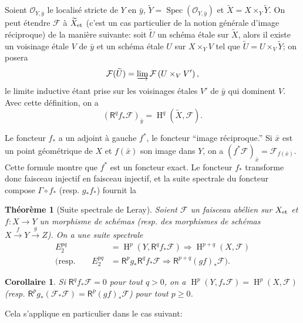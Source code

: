 \documentclass{book}
\DeclareMathOperator{\h}{H}
\DeclareMathOperator{\spec}{Spec}
\newcommand{\cF}{\mathcal{F}}
\newcommand{\cO}{\mathcal{O}}
\newcommand{\et}[1]{{#1}_{\textnormal{et}}}
\newcommand{\R}{\mathsf{R}}
\newtheorem{corollary}[subsubsection]{Corollaire}
\newtheorem{theorem}[subsubsection]{Théorème}
\begin{document}
Soient $\cO_{Y,\bar y}$ le localisé stricte de $Y$ en $\bar y$, 
$\widetilde Y=\spec(\cO_{Y,\bar y})$ et $\widetilde X=X\times_Y \widetilde Y$. 
On peut étendre $\cF$ à $\et{\widetilde X}$ (c'est un cas particulier de la 
notion générale d'image réciproque) de la manière suivante: soit 
$\widetilde U$ un schéma étale sur $\widetilde X$, alors il existe un 
voisinage étale $V$ de $\bar y$ et un schéma étale $U$ sur $X\times_Y V$ tel 
que $\widetilde U=U\times_V \widetilde Y$; on posera 
\[
  \cF(\widetilde U)=\varinjlim \cF\left(U\times_V V'\right)\text{,}
\]
le limite inductive étant prise sur les voisinages étales $V'$ de $\bar y$ qui 
dominent $V$. Avec cette définition, on a 
\[
  \left(\R^q f_* \cF\right)_{\bar y} = \h^q(\widetilde X,\cF)\text{.}
\]

Le foncteur $f_*$ a un adjoint à gauche $f^*$, le foncteur ``image 
réciproque.'' Si $\bar x$ est un point géométrique de $X$ et $f(\bar x)$ son 
image dans $Y$, on a $(f^* \cF)_{\bar x} = \cF_{f(\bar x)}$. Cette formule montre 
que $f^*$ est un foncteur exact. Le foncteur $f_*$ transforme donc faisceau 
injectif en faisceau injectif, et la suite spectrale du foncteur compose 
$\Gamma\circ f_*$ (resp. $g_* f_*$) fournit la 





\begin{theorem}[Suite spectrale de Leray]\label{I:2-3-4}
Soient $\cF$ un faisceau abélien sur $\et X$ et $f:X\to Y$ un morphisme de 
schémas (resp. des morphismes de schémas $X\xrightarrow f Y \xrightarrow g Z$). 
On a une suite spectrale 
\begin{align*}
  E_2^{pq} &= \h^p(Y,\R^q f_* \cF) \Rightarrow \h^{p+q}(X,\cF) \\
  \text{(resp.}\qquad E_2^{pq} &= \R^p g_* \R^q f_* \cF \Rightarrow \R^{p+q}(gf)_* \cF\text{).}
\end{align*}
\end{theorem}





\begin{corollary}\label{I:2-3-5}
Si $\R^q f_* \cF=0$ pour tout $q>0$, on a $\h^p(Y,f_* \cF)=\h^p(X,\cF)$ (resp. 
$\R^p g_*(\cF_* \cF) = \R^p(g f)_* \cF$) pour tout $p\geqslant 0$. 
\end{corollary}

Cela s'applique en particulier dans le cas suivant:
\end{document}
